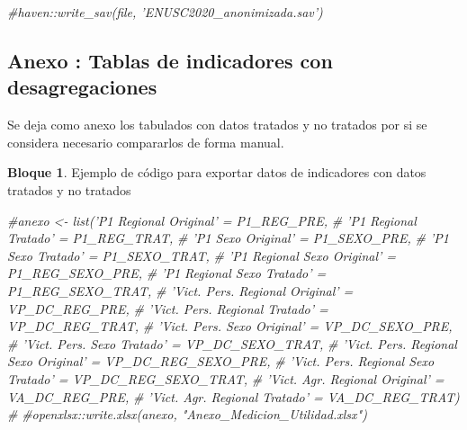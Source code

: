 \documentclass[]{book}
\newenvironment{Shaded}{\begin{snugshade}}{\end{snugshade}}
\newcommand{\CommentTok}[1]{\textcolor[rgb]{0.56,0.35,0.01}{\textit{#1}}}
\theoremstyle{definition}
\theoremstyle{definition}
\newtheorem{example}{Bloque}[chapter]
\theoremstyle{definition}
\theoremstyle{definition}
\theoremstyle{remark}
\begin{document}
\begin{Shaded}
\begin{Highlighting}[]
\CommentTok{#haven::write_sav(file, 'ENUSC2020_anonimizada.sav')}
\end{Highlighting}
\end{Shaded}

\hypertarget{anexo-tablas-de-indicadores-con-desagregaciones}{%
\subsection{Anexo : Tablas de indicadores con desagregaciones}\label{anexo-tablas-de-indicadores-con-desagregaciones}}

Se deja como anexo los tabulados con datos tratados y no tratados por si se considera necesario compararlos de forma manual.

\begin{example}
\protect\hypertarget{exm:bloque98nbm}{}{\label{exm:bloque98nbm} }Ejemplo de código para exportar datos de indicadores con datos tratados y no tratados
\end{example}

\begin{Shaded}
\begin{Highlighting}[]
\CommentTok{#anexo <- list('P1 Regional Original' = P1_REG_PRE,}
\CommentTok{#              'P1 Regional Tratado' = P1_REG_TRAT,}
\CommentTok{#              'P1 Sexo Original' = P1_SEXO_PRE,}
\CommentTok{#              'P1 Sexo Tratado' = P1_SEXO_TRAT,}
\CommentTok{#              'P1 Regional Sexo Original' = P1_REG_SEXO_PRE,}
\CommentTok{#              'P1 Regional Sexo Tratado' = P1_REG_SEXO_TRAT,}
\CommentTok{#              'Vict. Pers. Regional Original' = VP_DC_REG_PRE,}
\CommentTok{#              'Vict. Pers. Regional Tratado' = VP_DC_REG_TRAT,}
\CommentTok{#              'Vict. Pers. Sexo Original' = VP_DC_SEXO_PRE,}
\CommentTok{#              'Vict. Pers. Sexo Tratado' = VP_DC_SEXO_TRAT,}
\CommentTok{#              'Vict. Pers. Regional Sexo Original' = VP_DC_REG_SEXO_PRE,}
\CommentTok{#              'Vict. Pers. Regional Sexo Tratado' = VP_DC_REG_SEXO_TRAT,}
\CommentTok{#              'Vict. Agr. Regional Original' = VA_DC_REG_PRE,}
\CommentTok{#              'Vict. Agr. Regional Tratado' = VA_DC_REG_TRAT)}
\CommentTok{#}
\CommentTok{#openxlsx::write.xlsx(anexo, "Anexo_Medicion_Utilidad.xlsx")}
\end{Highlighting}
\end{Shaded}


\end{document}
